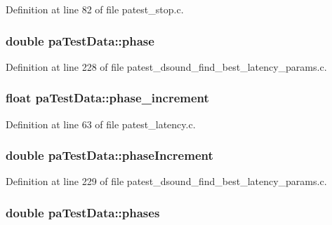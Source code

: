 Definition at line 82 of file patest\+\_\+stop.\+c.

\subsubsection[{\texorpdfstring{phase}{phase}}]{\setlength{\rightskip}{0pt plus 5cm}double pa\+Test\+Data\+::phase}\hypertarget{structpa_test_data_a64605f187ec79bda1bcbcc818781d486}{}\label{structpa_test_data_a64605f187ec79bda1bcbcc818781d486}


Definition at line 228 of file patest\+\_\+dsound\+\_\+find\+\_\+best\+\_\+latency\+\_\+params.\+c.

\subsubsection[{\texorpdfstring{phase\+\_\+increment}{phase_increment}}]{\setlength{\rightskip}{0pt plus 5cm}float pa\+Test\+Data\+::phase\+\_\+increment}\hypertarget{structpa_test_data_aeb5c545eb89c80f571541e79e4dc6c49}{}\label{structpa_test_data_aeb5c545eb89c80f571541e79e4dc6c49}


Definition at line 63 of file patest\+\_\+latency.\+c.

\subsubsection[{\texorpdfstring{phase\+Increment}{phaseIncrement}}]{\setlength{\rightskip}{0pt plus 5cm}double pa\+Test\+Data\+::phase\+Increment}\hypertarget{structpa_test_data_a5f8db72e12b41cc07c48c8b87e00196b}{}\label{structpa_test_data_a5f8db72e12b41cc07c48c8b87e00196b}


Definition at line 229 of file patest\+\_\+dsound\+\_\+find\+\_\+best\+\_\+latency\+\_\+params.\+c.

\subsubsection[{\texorpdfstring{phases}{phases}}]{\setlength{\rightskip}{0pt plus 5cm}double pa\+Test\+Data\+::phases}\hypertarget{structpa_test_data_af30f412d35aed12d7780b447d54aeeeb}{}\label{structpa_test_data_af30f412d35aed12d7780b447d54aeeeb}


